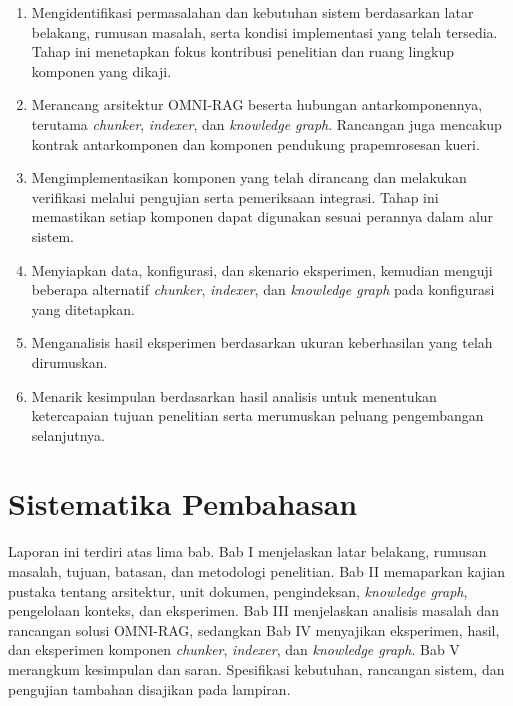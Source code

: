 \begin{enumerate}
    \item Mengidentifikasi permasalahan dan kebutuhan sistem berdasarkan latar belakang, rumusan masalah, serta kondisi implementasi yang telah tersedia. Tahap ini menetapkan fokus kontribusi penelitian dan ruang lingkup komponen yang dikaji.
    \item Merancang arsitektur OMNI-RAG beserta hubungan antarkomponennya, terutama \emph{chunker}, \emph{indexer}, dan \emph{knowledge graph}. Rancangan juga mencakup kontrak antarkomponen dan komponen pendukung prapemrosesan kueri.
    \item Mengimplementasikan komponen yang telah dirancang dan melakukan verifikasi melalui pengujian serta pemeriksaan integrasi. Tahap ini memastikan setiap komponen dapat digunakan sesuai perannya dalam alur sistem.
    \item Menyiapkan data, konfigurasi, dan skenario eksperimen, kemudian menguji beberapa alternatif \emph{chunker}, \emph{indexer}, dan \emph{knowledge graph} pada konfigurasi yang ditetapkan.
    \item Menganalisis hasil eksperimen berdasarkan ukuran keberhasilan yang telah dirumuskan.
    \item Menarik kesimpulan berdasarkan hasil analisis untuk menentukan ketercapaian tujuan penelitian serta merumuskan peluang pengembangan selanjutnya.
\end{enumerate}

\section{Sistematika Pembahasan}

Laporan ini terdiri atas lima bab. Bab I menjelaskan latar belakang, rumusan
masalah, tujuan, batasan, dan metodologi penelitian. Bab II memaparkan kajian
pustaka tentang arsitektur, unit dokumen, pengindeksan, \emph{knowledge graph},
pengelolaan konteks, dan eksperimen. Bab III menjelaskan analisis masalah dan
rancangan solusi OMNI-RAG, sedangkan Bab IV menyajikan eksperimen, hasil, dan
eksperimen komponen \emph{chunker}, \emph{indexer}, dan \emph{knowledge graph}.
Bab V merangkum kesimpulan dan saran. Spesifikasi kebutuhan, rancangan sistem,
dan pengujian tambahan disajikan pada lampiran.
